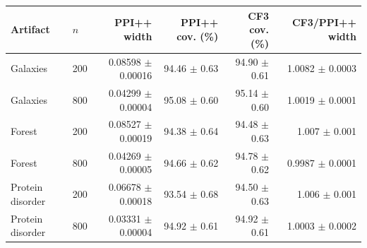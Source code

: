 \small
\begin{tabular}{llrrrr}
\toprule
Artifact & $n$ & PPI++ width & PPI++ cov. (\%) & CF3 cov. (\%) & CF3/PPI++ width \\
\midrule
Galaxies & 200 & 0.08598 $\pm$ 0.00016 & 94.46 $\pm$ 0.63 & 94.90 $\pm$ 0.61 & 1.0082 $\pm$ 0.0003 \\
Galaxies & 800 & 0.04299 $\pm$ 0.00004 & 95.08 $\pm$ 0.60 & 95.14 $\pm$ 0.60 & 1.0019 $\pm$ 0.0001 \\
Forest & 200 & 0.08527 $\pm$ 0.00019 & 94.38 $\pm$ 0.64 & 94.48 $\pm$ 0.63 & 1.007 $\pm$ 0.001 \\
Forest & 800 & 0.04269 $\pm$ 0.00005 & 94.66 $\pm$ 0.62 & 94.78 $\pm$ 0.62 & 0.9987 $\pm$ 0.0001 \\
Protein disorder & 200 & 0.06678 $\pm$ 0.00018 & 93.54 $\pm$ 0.68 & 94.50 $\pm$ 0.63 & 1.006 $\pm$ 0.001 \\
Protein disorder & 800 & 0.03331 $\pm$ 0.00004 & 94.92 $\pm$ 0.61 & 94.92 $\pm$ 0.61 & 1.0003 $\pm$ 0.0002 \\
\bottomrule
\end{tabular}
